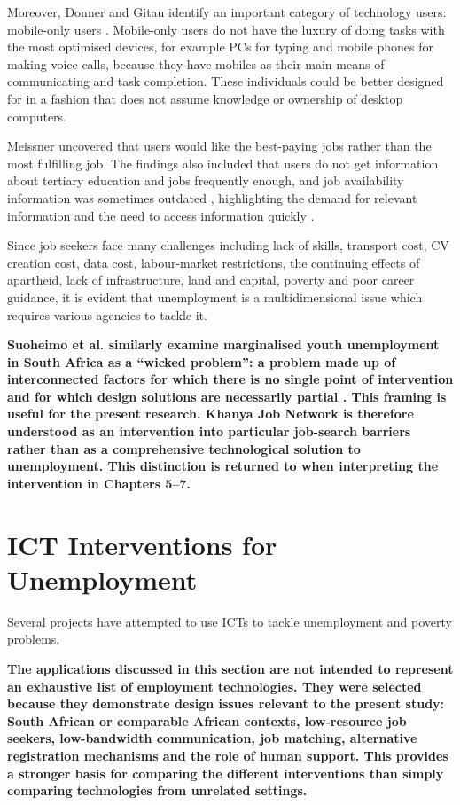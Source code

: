 Moreover, Donner and Gitau identify an important category of technology users: mobile-only users \cite{donner2009}. Mobile-only users do not have the luxury of doing tasks with the most optimised devices, for example PCs for typing and mobile phones for making voice calls, because they have mobiles as their main means of communicating and task completion. These individuals could be better designed for in a fashion that does not assume knowledge or ownership of desktop computers.

Meissner uncovered that users would like the best-paying jobs rather than the most fulfilling job. The findings also included that users do not get information about tertiary education and jobs frequently enough, and job availability information was sometimes outdated \cite{meissner2011}, highlighting the demand for relevant information and the need to access information quickly \cite{bhavnani2008}.

Since job seekers face many challenges including lack of skills, transport cost, CV creation cost, data cost, labour-market restrictions, the continuing effects of apartheid, lack of infrastructure, land and capital, poverty and poor career guidance, it is evident that unemployment is a multidimensional issue which requires various agencies to tackle it.

\textbf{Suoheimo et al. similarly examine marginalised youth unemployment in South Africa as a “wicked problem”: a problem made up of interconnected factors for which there is no single point of intervention and for which design solutions are necessarily partial \cite{suoheimo2021}. This framing is useful for the present research. Khanya Job Network is therefore understood as an intervention into particular job-search barriers rather than as a comprehensive technological solution to unemployment. This distinction is returned to when interpreting the intervention in Chapters 5–7.}

\section{ICT Interventions for Unemployment}
\label{sec:ict-interventions}

Several projects have attempted to use ICTs to tackle unemployment and poverty problems.

\textbf{The applications discussed in this section are not intended to represent an exhaustive list of employment technologies. They were selected because they demonstrate design issues relevant to the present study: South African or comparable African contexts, low-resource job seekers, low-bandwidth communication, job matching, alternative registration mechanisms and the role of human support. This provides a stronger basis for comparing the different interventions than simply comparing technologies from unrelated settings.}

